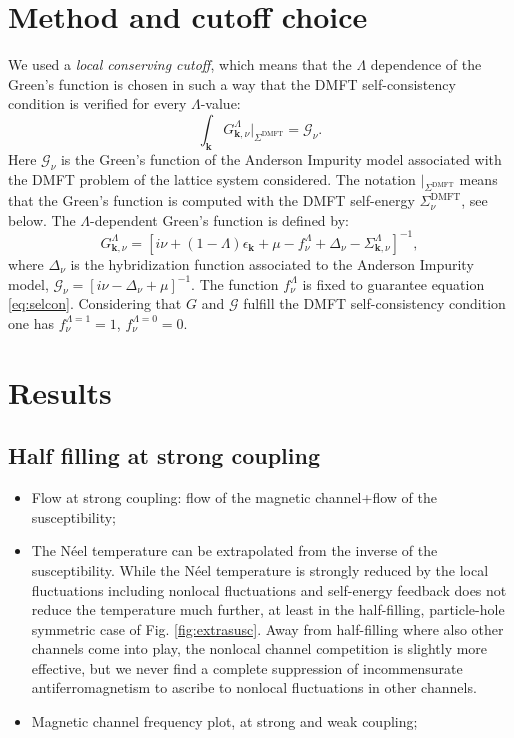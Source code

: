 \documentclass[paper=a4, fontsize=11pt]{scrartcl} %
\numberwithin{equation}{section} %
\numberwithin{figure}{section} %
\numberwithin{table}{section} %
\begin{document}
\section{Method and cutoff choice}
We used a \textit{local conserving cutoff}, which means that the $\Lambda$ dependence of the Green's function is chosen in such a way that the DMFT self-consistency condition is verified for every $\Lambda$-value:
\begin{equation}
\label{eq:selcon}
\int_{\mathbf{k}} G^\Lambda_{\mathbf{k},\nu}|_{\Sigma^{\mathrm{DMFT}}} = \mathcal{G}_{\nu}.   
\end{equation}
Here $\mathcal{G}_{\nu}$ is the Green's function of the Anderson Impurity model associated with the DMFT problem of the lattice system considered. The notation $|_{\Sigma^{\mathrm{DMFT}}}$ means that the Green's function is computed with the DMFT self-energy $\Sigma_\nu^{\mathrm{DMFT}}$, see below. 
The $\Lambda$-dependent Green's function is defined by: 
\begin{equation}
G_{\mathbf{k},\nu}^\Lambda = \left[i\nu+(1-\Lambda)\epsilon_{\mathbf{k}}
+\mu -
f^\Lambda_{\nu}+ \Delta_{\nu} -\Sigma_{\mathbf{k},\nu}^\Lambda
 \right]^{-1},
\end{equation}
where $\Delta_\nu$ is the hybridization function associated to the Anderson Impurity model, $\mathcal{G}_\nu=\left[i\nu-\Delta_\nu+\mu \right]^{-1}$. The function $f^\Lambda_\nu$ is fixed to guarantee equation \ref{eq:selcon}. Considering that $G$ and $\mathcal{G}$ fulfill the DMFT self-consistency condition one has $f^{\Lambda=1}_\nu=1$, $f^{\Lambda=0}_\nu=0$.  

\section{Results}
\subsection{Half filling at strong coupling} 
\begin{itemize}
\item Flow at strong coupling: flow of the magnetic channel+flow of the susceptibility; 
\item The N\' eel temperature can be extrapolated from the inverse of the susceptibility. 
While the N\' eel temperature is strongly reduced by the local fluctuations including nonlocal fluctuations and self-energy feedback does not reduce the temperature much further, at least in the half-filling, particle-hole symmetric case of Fig. \ref{fig:extrasusc}. Away from half-filling where also other channels come into play, the nonlocal channel competition is slightly more effective, but we never find a complete suppression of incommensurate antiferromagnetism to ascribe to nonlocal fluctuations in other channels. 

\item Magnetic channel frequency plot, at strong and weak coupling; 
\end{itemize} 
\end{document}
